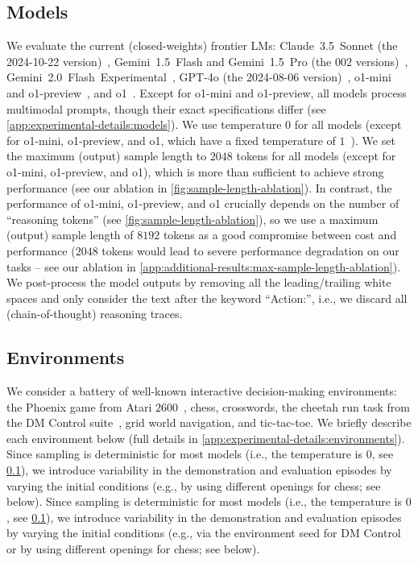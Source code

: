 \documentclass{article}
\newcommand{\eg}{e.g., }
\newcommand{\ie}{i.e., }
\newcommand{\claude}{Claude~3.5~Sonnet}
\newcommand{\expflash}{Gemini~2.0~Flash~Experimental}
\newcommand{\flash}{Gemini~1.5~Flash}
\newcommand{\pro}{Gemini~1.5~Pro}
\newcommand{\gpt}{GPT-4o}
\newcommand{\mini}{o1-mini}
\newcommand{\preview}{o1-preview}
\newcommand{\oone}{o1}
\begin{document}
\subsection{Models}
\label{sec:methods:models}
We evaluate the current (closed-weights) frontier LMs:
\claude{} (the 2024-10-22 version)~\citep{anthropic2024claude3.5, anthropic2024introducing},
\flash{} and \pro{} (the $002$ versions)~\citep{reid2024gemini},
\expflash{}~\citep{google2024introducing},
\gpt{} (the 2024-08-06 version)~\citep{openai2024gpt4o,openai2024gpt4ocard},
\mini{} and \preview{}~\citep{openai2024o1}, and
\oone{}~\citep{openai2024o1card}.
Except for \mini{} and \preview{}, all models process multimodal prompts, though their exact specifications differ (see \cref{app:experimental-details:models}).
We use temperature $0$ for all models (except for \mini{}, \preview{}, and \oone{}, which have a fixed temperature of $1$~\citep{openai2024reasoning}).
We set the maximum (output) sample length to $2048$ tokens for all models (except for \mini{}, \preview{}, and \oone{}), which is more than sufficient to achieve strong performance (see our ablation in \cref{fig:sample-length-ablation}).
In contrast, the performance of \mini{}, \preview{}, and \oone{} crucially depends on the number of ``reasoning tokens'' (see \cref{fig:sample-length-ablation}), so we use a maximum (output) sample length of $8192$ tokens as a good compromise between cost and performance ($2048$ tokens would lead to severe performance degradation on our tasks -- see our ablation in \cref{app:additional-results:max-sample-length-ablation}).
We post-process the model outputs by removing all the leading/trailing white spaces and only consider the text after the keyword ``Action:'', \ie we discard all (chain-of-thought) reasoning traces.
\subsection{Environments}
\label{sec:methods:environments}
We consider a battery of well-known interactive decision-making environments: the Phoenix game from Atari $2600$~\citep{bellemare2013arcade}, chess, crosswords, the cheetah run task from the DM Control suite~\citep{tassa2018deepmind}, grid world navigation, and tic-tac-toe.
We briefly describe each environment below (full details in \cref{app:experimental-details:environments}).
\ificlr
Since sampling is deterministic for most models (\ie the temperature is $0$, see \cref{sec:methods:models}), we introduce variability in the demonstration and evaluation episodes by varying the initial conditions (\eg by using different openings for chess; see below).
\else
Since sampling is deterministic for most models (\ie the temperature is $0$, see \cref{sec:methods:models}), we introduce variability in the demonstration and evaluation episodes by varying the initial conditions (\eg via the environment seed for DM Control or by using different openings for chess; see below).
\fi
\end{document}
